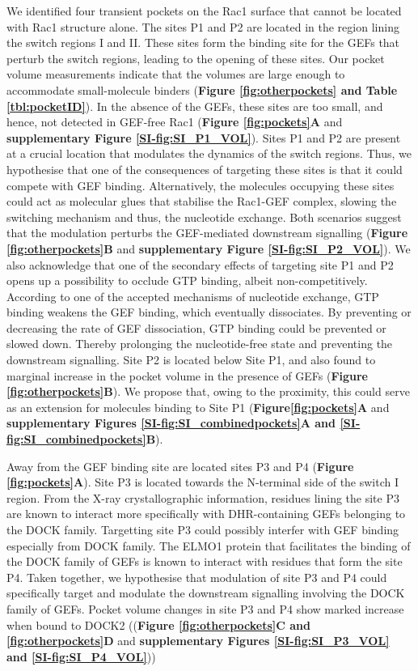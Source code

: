 \documentclass[12pt,a4paper]{achemso}
\begin{document}
We identified four transient pockets on the Rac1 surface that cannot be located with Rac1 structure alone. The sites P1 and P2 are located in the region lining the switch regions I and II. These sites form the binding site for the GEFs that perturb the switch regions, leading to the opening of these sites. Our pocket volume measurements indicate that the volumes are large enough to accommodate small-molecule binders (\textbf{Figure \ref{fig:otherpockets} and Table \ref{tbl:pocketID}}). In the absence of the GEFs, these sites are too small, and hence, not detected in GEF-free Rac1 (\textbf{Figure \ref{fig:pockets}A} and \textbf{supplementary Figure \ref{SI-fig:SI_P1_VOL}}).  
Sites P1 and P2 are present at a crucial location that modulates the dynamics of the switch regions. Thus, we hypothesise that one of the consequences of targeting these sites is that it could compete with GEF binding. Alternatively, the molecules occupying these sites could act as molecular glues that stabilise the Rac1-GEF complex, slowing the switching mechanism and thus, the nucleotide exchange. Both scenarios suggest that the modulation perturbs the GEF-mediated downstream signalling (\textbf{Figure \ref{fig:otherpockets}B} and \textbf{supplementary Figure \ref{SI-fig:SI_P2_VOL}}). We also acknowledge that one of the secondary effects of targeting site P1 and P2 opens up a possibility to occlude GTP binding, albeit non-competitively. According to one of the accepted mechanisms of nucleotide exchange\cite{cherfils2013regulation}, GTP binding weakens the GEF binding, which eventually dissociates. By preventing or decreasing the rate of GEF dissociation, GTP binding could be prevented or slowed down. Thereby prolonging the nucleotide-free state and preventing the downstream signalling. Site P2 is located below Site P1, and also found to marginal increase in the pocket volume in the presence of GEFs (\textbf{Figure \ref{fig:otherpockets}B}). We propose that, owing to the proximity, this could serve as an extension for molecules binding to Site P1 (\textbf{Figure\ref{fig:pockets}A} and \textbf{supplementary Figures \ref{SI-fig:SI_combinedpockets}A and \ref{SI-fig:SI_combinedpockets}B}).

Away from the GEF binding site are located sites P3 and P4 (\textbf{Figure \ref{fig:pockets}A}). Site P3 is located towards the N-terminal side of the switch I region. From the X-ray crystallographic information, residues lining the site P3 are known to interact more specifically with DHR-containing GEFs belonging to the DOCK family\cite{DOCK5_EMLO1, dock2pdb}. Targetting site P3 could possibly interfer with GEF binding especially from DOCK family. The ELMO1 protein that facilitates the binding of the DOCK family of GEFs is known to interact with residues that form the site P4\cite{DOCK5_EMLO1}. Taken together, we hypothesise that modulation of site P3 and P4 could specifically target and modulate the downstream signalling involving the DOCK family of GEFs. Pocket volume changes in site P3 and P4 show marked increase when bound to DOCK2 ((\textbf{Figure \ref{fig:otherpockets}C and \ref{fig:otherpockets}D} and \textbf{supplementary Figures \ref{SI-fig:SI_P3_VOL} and \ref{SI-fig:SI_P4_VOL}})) 
\end{document}
